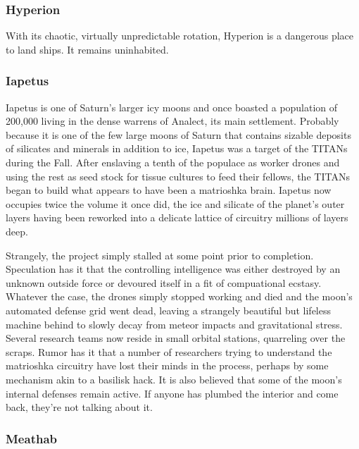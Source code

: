 \subsubsection{Hyperion} \label{sec:hyperion} 

With its chaotic, virtually unpredictable rotation, Hyperion is a dangerous place to land ships. It remains uninhabited. 

\subsubsection{Iapetus} \label{sec:iapetus} 

Iapetus is one of Saturn's larger icy moons and once boasted a population of 200,000 living in the dense warrens of Analect, its main settlement. Probably because it is one of the few large moons of Saturn that contains sizable deposits of silicates and minerals in addition to ice, Iapetus was a target of the TITANs during the Fall. After enslaving a tenth of the populace as worker drones and using the rest as seed stock for tissue cultures to feed their fellows, the TITANs began to build what appears to have been a matrioshka brain. Iapetus now occupies twice the volume it once did, the ice and silicate of the planet's outer layers having been reworked into a delicate lattice of circuitry millions of layers deep. 

Strangely, the project simply stalled at some point prior to completion. Speculation has it that the controlling intelligence was either destroyed by an unknown outside force or devoured itself in a fit of compuational ecstasy. Whatever the case, the drones simply stopped working and died and the moon's automated defense grid went dead, leaving a strangely beautiful but lifeless machine behind to slowly decay from meteor impacts and gravitational stress. Several research teams now reside in small orbital stations, quarreling over the scraps. Rumor has it that a number of researchers trying to understand the matrioshka circuitry have lost their minds in the process, perhaps by some mechanism akin to a basilisk hack. It is also believed that some of the moon's internal defenses remain active. If anyone has plumbed the interior and come back, they're not talking about it. 

\subsubsection{Meathab} \label{sec:meathab} 


